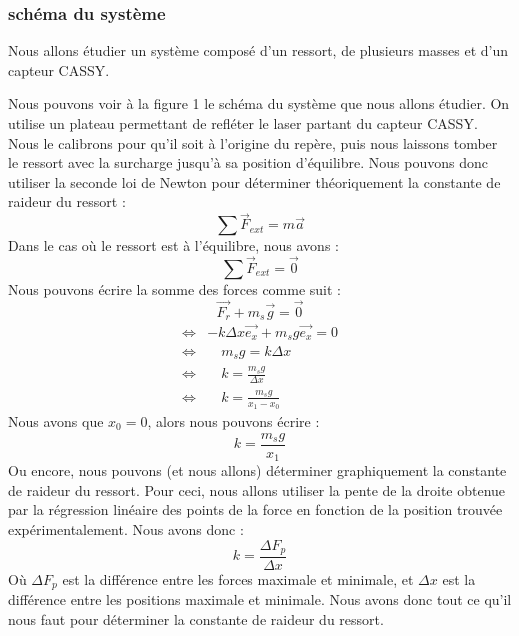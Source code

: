         \subsubsection{schéma du système}
            Nous allons étudier un système composé d'un ressort, de plusieurs masses et d'un capteur CASSY.
            
            Nous pouvons voir à la figure 1 le schéma du système que nous allons étudier. On 
            utilise un plateau permettant de refléter le laser partant du capteur CASSY.
            Nous le calibrons pour qu'il soit à l'origine du repère, puis nous laissons
            tomber le ressort avec la surcharge jusqu'à sa position d'équilibre.
            Nous pouvons donc utiliser la seconde loi de Newton pour déterminer théoriquement
            la constante de raideur du ressort : 
            \begin{equation}
                \sum \vec{F}_{ext} = m \vec{a}
            \end{equation}
            Dans le cas où le ressort est à l'équilibre, nous avons :
            \begin{equation}
                \sum \vec{F}_{ext} = \vec{0}
            \end{equation}
            Nous pouvons écrire la somme des forces comme suit :
            \begin{equation}
                \vec{F_r} + m_s\vec{g} = \vec{0}
            \end{equation}
            \begin{align*}
                \Leftrightarrow & -k\Delta x \vec{e_x} + m_s g \vec{e_x} = 0 \\
                \Leftrightarrow & \quad m_s g = k \Delta x \\
                \Leftrightarrow & \quad k = \frac{m_s g}{\Delta x} \\
                \Leftrightarrow & \quad k = \frac{m_s g}{x_1 - x_0}
            \end{align*}
            Nous avons que $x_0 = 0$, alors nous pouvons écrire :
            \begin{equation}
                k = \frac{m_s g}{x_1}
            \end{equation}
            Ou encore, nous pouvons (et nous allons) déterminer graphiquement la constante
            de raideur du ressort. Pour ceci, nous allons utiliser la pente de la droite obtenue
            par la régression linéaire des points de la force en fonction de la position trouvée
            expérimentalement. Nous avons donc :
            \begin{equation}
                k = \frac{\Delta F_p}{\Delta x}
            \end{equation}
            Où $\Delta F_p$ est la différence entre les forces maximale et minimale,
            et $\Delta x$ est la différence entre les positions maximale et minimale.
            \newline
            Nous avons donc tout ce qu'il nous faut pour déterminer la constante de raideur
            du ressort.

